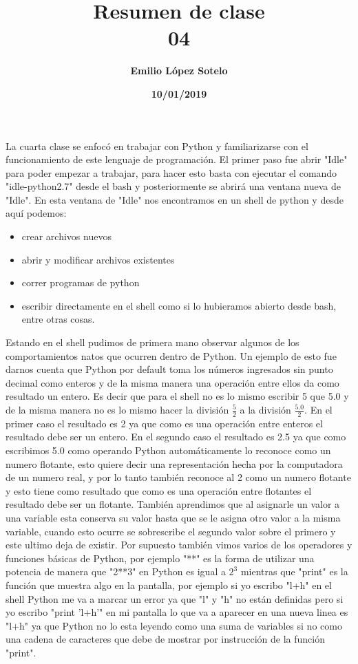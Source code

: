 \documentclass[letterpaper, 12pt, oneside]{article}
\title{\Huge \textbf{Resumen de clase\\04}}
\author{\textbf{Emilio López Sotelo}}
\date{\textbf{10/01/2019}}
\begin{document}
	\maketitle
	La cuarta clase se enfocó en trabajar con Python y familiarizarse con el funcionamiento de este lenguaje de programación. El primer paso fue abrir "Idle" para poder empezar a trabajar, para hacer esto basta con ejecutar el comando "idle-python2.7" desde el bash y posteriormente se abrirá una ventana nueva de "Idle". En esta ventana de "Idle" nos encontramos en un shell de python y desde aquí podemos:
	\begin{itemize}
		\item crear archivos nuevos
		\item abrir y modificar archivos existentes
		\item correr programas de python
		\item escribir directamente en el shell como si lo hubieramos abierto desde bash, entre otras cosas.
	\\
	\end{itemize}
	Estando en el shell pudimos de primera mano observar algunos de los comportamientos natos que ocurren dentro de Python. Un ejemplo de esto fue darnos cuenta que Python por default toma los números ingresados sin punto decimal como enteros y de la misma manera una operación entre ellos da como resultado un entero. Es decir que para el shell no es lo mismo escribir 5 que 5.0 y de la misma manera no es lo mismo hacer la división $\frac{5}{2}$ a la división $\frac{5.0}{2}$. En el primer caso el resultado es 2 ya que como es una operación entre enteros el resultado debe ser un entero. En el segundo caso el resultado es 2.5 ya que como escribimos 5.0 como operando Python automáticamente lo reconoce como un numero flotante, esto quiere decir una representación hecha por la computadora de un numero real, y por lo tanto también reconoce al 2 como un numero flotante y esto tiene como resultado que como es una operación entre flotantes el resultado debe ser un flotante. También aprendimos que al asignarle un valor a una variable esta conserva su valor hasta que se le asigna otro valor a la misma variable, cuando esto ocurre se sobrescribe el segundo valor sobre el primero y este ultimo deja de existir. Por supuesto también vimos varios de los operadores y funciones básicas de Python, por ejemplo "**" es la forma de utilizar una potencia de manera que "2**3" en Python es igual a $2^{3}$ mientras que "print" es la función que muestra algo en la pantalla, por ejemplo si yo escribo "l+h" en el shell Python me va a marcar un error ya que "l" y "h" no están definidas pero si yo escribo "print 'l+h'" en mi pantalla lo que va a aparecer en una nueva linea es "l+h" ya que Python no lo esta leyendo como una suma de variables si no como una cadena de caracteres que debe de mostrar por instrucción de la función "print".
\end{document}

